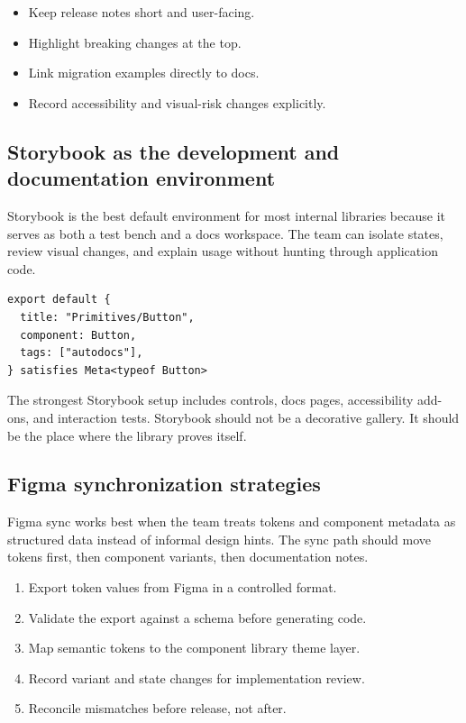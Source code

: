 \begin{itemize}[leftmargin=*, itemsep=0.35em]
  \item Keep release notes short and user-facing.
  \item Highlight breaking changes at the top.
  \item Link migration examples directly to docs.
  \item Record accessibility and visual-risk changes explicitly.
\end{itemize}

\subsection{Storybook as the development and documentation environment}
Storybook is the best default environment for most internal libraries because it serves as both a test bench and a docs workspace. The team can isolate states, review visual changes, and explain usage without hunting through application code.

\begin{verbatim}
export default {
  title: "Primitives/Button",
  component: Button,
  tags: ["autodocs"],
} satisfies Meta<typeof Button>
\end{verbatim}

The strongest Storybook setup includes controls, docs pages, accessibility add-ons, and interaction tests. Storybook should not be a decorative gallery. It should be the place where the library proves itself.

\subsection{Figma synchronization strategies}
Figma sync works best when the team treats tokens and component metadata as structured data instead of informal design hints. The sync path should move tokens first, then component variants, then documentation notes.

\begin{enumerate}[leftmargin=*, itemsep=0.35em]
  \item Export token values from Figma in a controlled format.
  \item Validate the export against a schema before generating code.
  \item Map semantic tokens to the component library theme layer.
  \item Record variant and state changes for implementation review.
  \item Reconcile mismatches before release, not after.
\end{enumerate}

